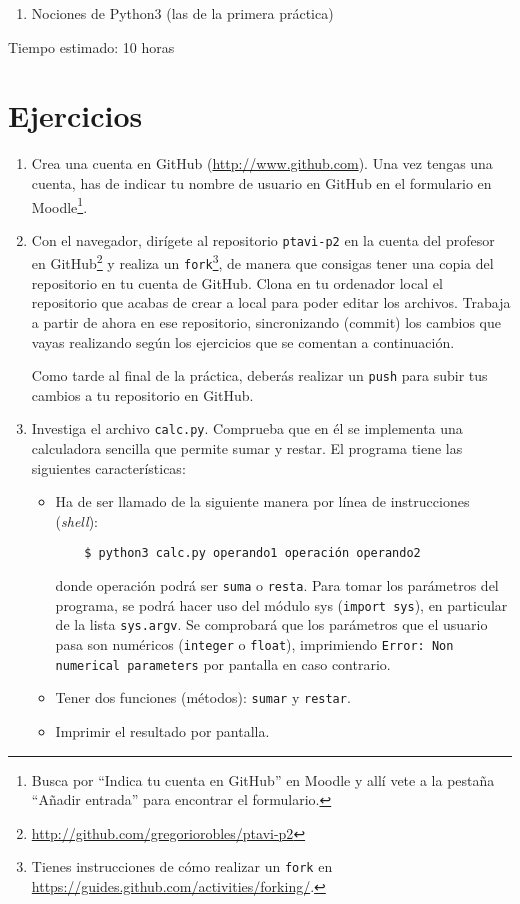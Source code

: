 \documentclass[11pt,a4paper]{article}
\begin{document}
\begin{enumerate}
  \item Nociones de Python3 (las de la primera práctica)
\end{enumerate}

Tiempo estimado: 10 horas

\section{Ejercicios}

\begin{enumerate}

  \item Crea una cuenta en GitHub (\url{http://www.github.com}). Una vez tengas una cuenta, has de indicar tu nombre de usuario en GitHub en el formulario en Moodle\footnote{Busca por ``Indica tu cuenta en GitHub'' en Moodle y allí vete a la pestaña ``Añadir entrada'' para encontrar el formulario.}.

    \item Con el navegador, dirígete al repositorio \texttt{ptavi-p2} en la cuenta del profesor en GitHub\footnote{\url{http://github.com/gregoriorobles/ptavi-p2}} y realiza un \texttt{fork}\footnote{Tienes instrucciones de cómo realizar un \texttt{fork} en \url{https://guides.github.com/activities/forking/}.}, de manera que consigas tener una copia del repositorio en tu cuenta de GitHub. Clona en tu ordenador local el repositorio que acabas de crear a local para poder editar los archivos. Trabaja a partir de ahora en ese repositorio, sincronizando (commit) los cambios que vayas realizando según los ejercicios que se comentan a continuación.

  Como tarde al final de la práctica, deberás realizar un \texttt{push} para subir tus cambios a tu repositorio en GitHub.

  \item Investiga el archivo \texttt{calc.py}. Comprueba que en él se implementa una calculadora sencilla que permite sumar y restar. El programa tiene las siguientes características:
  \begin{itemize}
    \item Ha de ser llamado de la siguiente manera por línea de instrucciones (\emph{shell}):
    \begin{verbatim}
    $ python3 calc.py operando1 operación operando2
    \end{verbatim}
donde operación podrá ser \texttt{suma} o \texttt{resta}. Para tomar los parámetros del programa, se podrá hacer uso del módulo sys (\texttt{import sys}), en particular de la lista \texttt{sys.argv}. Se comprobará que los parámetros que el usuario pasa son numéricos (\texttt{integer} o \texttt{float}), imprimiendo \texttt{Error: Non numerical parameters} por pantalla en caso contrario.
    \item Tener dos funciones (métodos): \texttt{sumar} y \texttt{restar}.
    \item Imprimir el resultado por pantalla.
  \end{itemize}



\end{enumerate}
\end{document}
